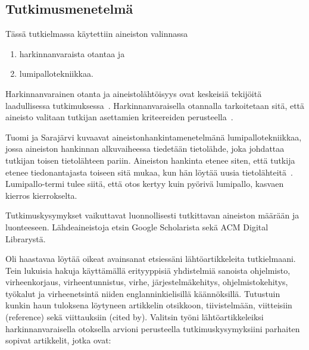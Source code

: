 \documentclass[finnish]{tktltiki2}
\theoremstyle{definition}
\theoremstyle{remark}
\begin{document}
\subsection{Tutkimusmenetelmä}

Tässä tutkielmassa käytettiin aineiston valinnassa
\begin{enumerate}
  \item harkinnanvaraista otantaa ja
  \item lumipallotekniikkaa.
\end{enumerate}

Harkinnanvarainen otanta ja aineistolähtöisyys ovat keskeisiä tekijöitä laadullisessa tutkimuksessa~\cite[s. 16-20]{laadullinen-tutkimus-ja-sisallonanalyysi}.
Harkinnanvaraisella otannalla tarkoitetaan sitä, että aineisto valitaan tutkijan asettamien kriteereiden perusteella~\cite{aineiston-maara-ja-tutkittavat}.

Tuomi ja Sarajärvi kuvaavat aineistonhankintamenetelmänä lumipallotekniikkaa, jossa aineiston hankinnan alkuvaiheessa tiedetään tietolähde, joka johdattaa tutkijan toisen tietolähteen pariin. Aineiston hankinta etenee siten, että tutkija etenee tiedonantajasta toiseen sitä mukaa, kun hän löytää uusia tietolähteitä~\cite[s. 88]{johdatus-laadulliseen-tutkimukseen}. Lumipallo-termi tulee siitä, että otos kertyy kuin pyörivä lumipallo, kasvaen kierros kierrokselta.

Tutkimuskysymykset vaikuttavat luonnollisesti tutkittavan aineiston määrään ja luonteeseen. Lähdeaineistoja etsin Google Scholarista sekä ACM Digital Librarystä.

Oli haastavaa löytää oikeat avainsanat etsiessäni lähtöartikkeleita tutkielmaani. Tein lukuisia hakuja käyttämällä erityyppisiä yhdistelmiä sanoista ohjelmisto, virheenkorjaus, virheentunnistus, virhe, järjestelmäkehitys, ohjelmistokehitys, työkalut ja virheenetsintä niiden englanninkielisillä käännöksillä. Tutustuin kunkin haun tuloksena löytyneen artikkelin otsikkoon, tiivistelmään, viitteisiin (reference) sekä viittauksiin (cited by). Valitsin työni lähtöartikkeleiksi harkinnanvaraisella otoksella arvioni perusteella tutkimuskysymyksiini parhaiten sopivat artikkelit, jotka ovat:
\end{document}

